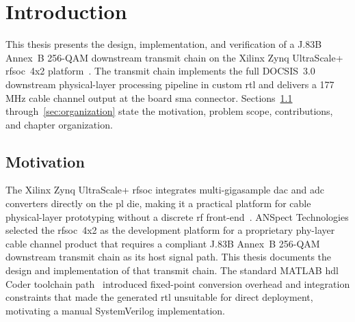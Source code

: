 

\chapter{Introduction}
\label{ch:introduction}

This thesis presents the design, implementation, and verification
of a J.83B Annex~B 256-QAM downstream transmit chain on the
Xilinx Zynq UltraScale+ \ac{rfsoc}~4x2 platform~\cite{AMD_UG1085}.
The transmit chain implements the full DOCSIS~3.0 downstream
physical-layer processing pipeline in custom \ac{rtl} and delivers
a 177\,MHz cable channel output at the board \ac{sma} connector.
Sections~\ref{sec:motivation} through~\ref{sec:organization} state
the motivation, problem scope, contributions, and chapter
organization.

\section{Motivation}
\label{sec:motivation}

The Xilinx Zynq UltraScale+ \ac{rfsoc} integrates multi-gigasample
\ac{dac} and \ac{adc} converters directly on the \ac{pl} die,
making it a practical platform for cable physical-layer prototyping
without a discrete \ac{rf} front-end~\cite{AMD_UG1085,Kovacs2024,Javaid2022}.
ANSpect Technologies selected the \ac{rfsoc}~4x2 as the development
platform for a proprietary \ac{phy}-layer cable channel product that
requires a compliant J.83B Annex~B 256-QAM downstream transmit chain
as its host signal path.
This thesis documents the design and implementation of that transmit chain.
The standard MATLAB \ac{hdl} Coder toolchain path~\cite{HDLCoder}
introduced fixed-point conversion overhead and integration constraints
that made the generated \ac{rtl} unsuitable for direct deployment,
motivating a manual SystemVerilog implementation.

